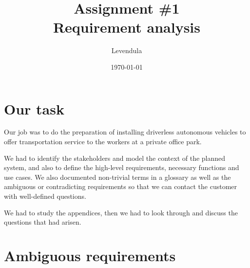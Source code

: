 \documentclass[a4paper]{article}
\title{Assignment \#1 \\ Requirement analysis}
\author{Levendula}
\date{\today}
\begin{document}


\tableofcontents
\clearpage

\section{Our task}



Our job was to do the preparation of installing driverless autonomous vehicles
to offer transportation service to the workers at a private office park.

We had to identify the stakeholders and model the context of the planned system,
and also to define the high-level requirements, necessary functions and use
cases. We also documented non-trivial terms in a glossary as well as the
ambiguous or contradicting requirements so that we can contact the customer with
well-defined questions.

We had to study the appendices, then we had to look through and discuss the
questions that had arisen.



\section{Ambiguous requirements}
\end{document}
